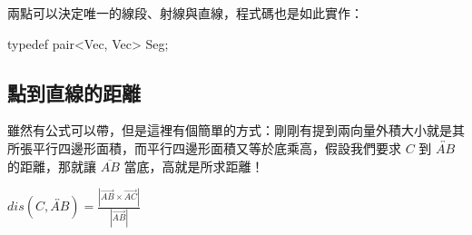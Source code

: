 \documentclass[main.tex]{subfiles}
\begin{document}
兩點可以決定唯一的線段、射線與直線，程式碼也是如此實作：

\begin{C++}
typedef pair<Vec, Vec> Seg;
\end{C++}

\subsection{點到直線的距離}

雖然有公式可以帶，但是這裡有個簡單的方式：剛剛有提到兩向量外積大小就是其所張平行四邊形面積，而平行四邊形面積又等於底乘高，假設我們要求 $C$ 到 $\overleftrightarrow{AB}$ 的距離，那就讓 $\overline{AB}$ 當底，高就是所求距離！

$dis(C, \overleftrightarrow{AB}) = \frac{|\vec{AB} \times \vec{AC}|}{|\vec{AB}|}$
\end{document}
